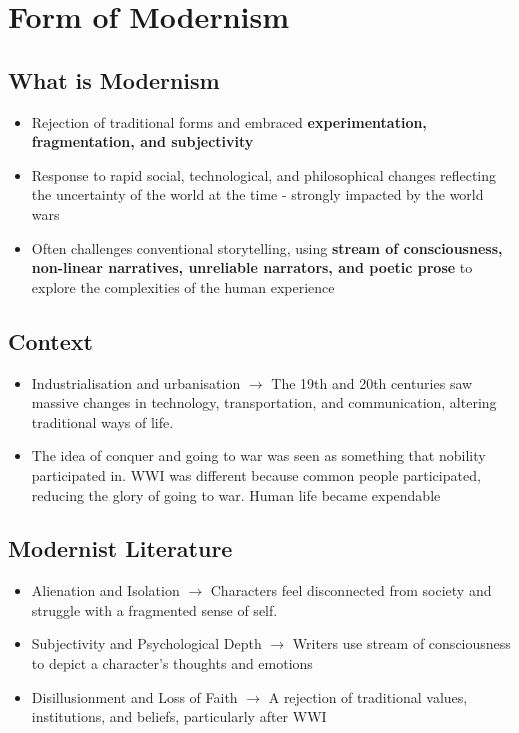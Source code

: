 \section{Form of Modernism}
	
	\subsection{What is Modernism}
	
		\begin{itemize}
			\item Rejection of traditional forms and embraced \textbf{experimentation, fragmentation, and subjectivity}
			\item Response to rapid social, technological, and philosophical changes reflecting the uncertainty of the world at the time - strongly impacted by the world wars
			\item Often challenges conventional storytelling, using \textbf{stream of consciousness, non-linear narratives, unreliable narrators, and poetic prose} to explore the complexities of the human experience
		\end{itemize}

	\subsection{Context}
	
		\begin{itemize}
			\item Industrialisation and urbanisation $\rightarrow$ The 19th and 20th centuries saw massive changes in technology, transportation, and communication, altering traditional ways of life.
			\item The idea of conquer and going to war was seen as something that nobility participated in. WWI was different because common people participated, reducing the glory of going to war. Human life became expendable
		\end{itemize}

	\subsection{Modernist Literature}
	
		\begin{itemize}
			\item Alienation and Isolation $\rightarrow$ Characters feel disconnected from society and struggle with a fragmented sense of self.
			\item Subjectivity and Psychological Depth $\rightarrow$ Writers use stream of consciousness to depict a character's thoughts and emotions
			\item Disillusionment and Loss of Faith $\rightarrow$ A rejection of traditional values, institutions, and beliefs, particularly after WWI
		\end{itemize}

